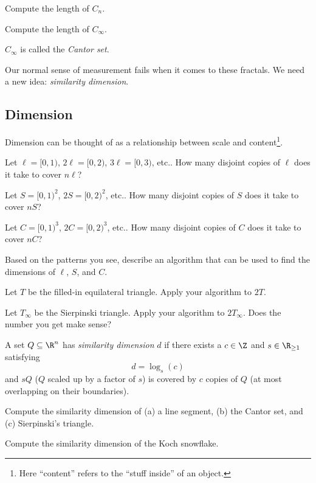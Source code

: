	\begin{parts}
		\item Compute the length of $C_n$.
		\item Compute the length of $C_\infty$.
	\end{parts}
	$C_\infty$ is called the \emph{Cantor set}.


	\bigskip
	Our normal sense of measurement fails when it comes to these fractals. We need a new idea: \emph{similarity dimension}.

	\newpage
	\subsection*{Dimension}

	Dimension can be thought of as a relationship between scale and content\footnote{Here ``content'' refers to the ``stuff inside'' of an object.}.

	\question
	\begin{parts}
		\item 
		Let $\ell=[0,1)$, $2\ell=[0,2)$, $3\ell=[0,3)$, etc.. How many disjoint copies of $\ell$ does it take to
		cover $n\ell$?
		\item Let $S=[0,1)^2$, $2S=[0,2)^2$, etc.. How many disjoint copies of $S$ does it take to cover $nS$?
		\item Let $C=[0,1)^3$, $2C=[0,2)^3$, etc.. How many disjoint copies of $C$ does it take to cover $nC$?
		\item Based on the patterns you see, describe an algorithm that can be used to find the dimensions of $\ell$, $S$, and
			$C$.
		\item Let $T$ be the filled-in equilateral triangle. Apply your algorithm to $2T$.
		\item Let $T_\infty$ be the Sierpinski triangle. Apply your algorithm to $2T_\infty$. Does the number you get
			make sense?
	\end{parts}

	\begin{definition}
		A set $Q\subseteq \R^n$ has \emph{similarity dimension} $d$ if there exists a $c\in \Z$
		and $s\in \R_{\geq 1}$ satisfying
		\[
			d=\log_s(c)
		\]
		and $sQ$ ($Q$ scaled up by a factor of $s$) is covered by
		$c$ copies of $Q$ (at most overlapping on their boundaries).

	\end{definition}

	\question
	\begin{parts}
		\item Compute the similarity dimension of (a) a line segment, (b) the Cantor set, and (c) Sierpinski's triangle.
		\item Compute the similarity dimension of the Koch snowflake.
	\end{parts}

